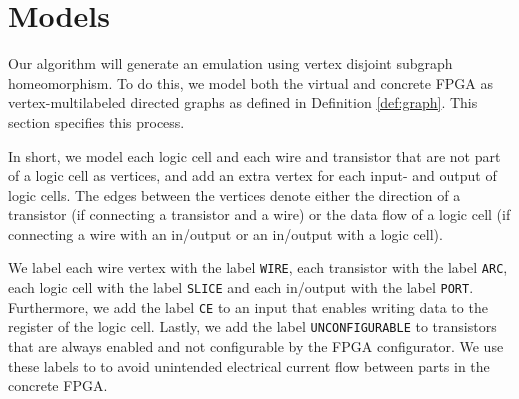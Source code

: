 \chapter{Models}
\label{sec:models}
Our algorithm will generate an emulation using vertex disjoint subgraph homeomorphism. To do this, we model both the virtual and concrete FPGA as vertex-multilabeled directed graphs as defined in Definition \ref{def:graph}. This section specifies this process.

In short, we model each logic cell and each wire and transistor that are not part of a logic cell as vertices, and add an extra vertex for each input- and output of logic cells. The edges between the vertices denote either the direction of a transistor (if connecting a transistor and a wire) or the data flow of a logic cell (if connecting a wire with an in/output or an in/output with a logic cell).

We label each wire vertex with the label \texttt{WIRE}, each transistor with the label \texttt{ARC}, each logic cell with the label \texttt{SLICE} and each in/output with the label \texttt{PORT}. Furthermore, we add the label \texttt{CE} to an input that enables writing data to the register of the logic cell. Lastly, we add the label \texttt{UNCONFIGURABLE} to transistors that are always enabled and not configurable by the FPGA configurator. We use these labels to to avoid unintended electrical current flow between parts in the concrete FPGA.